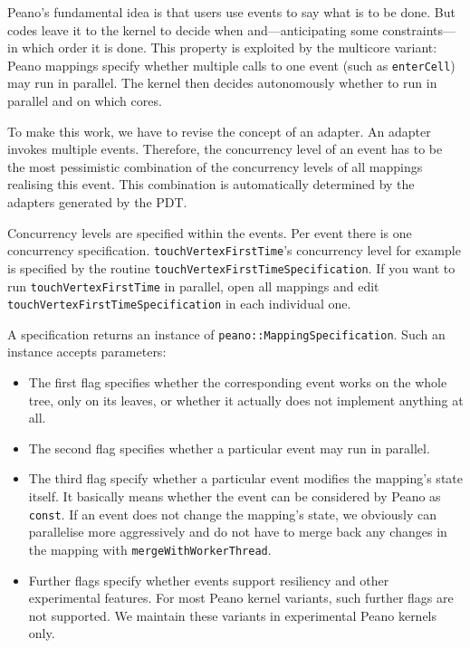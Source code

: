 Peano's fundamental idea is that users use events to say what is to be done. 
But codes leave it to the kernel to decide when and---anticipating some
constraints---in which order it is done.
This property is exploited by the multicore variant: 
Peano mappings specify whether multiple calls to one event (such as
\texttt{enterCell}) may run in parallel.
The kernel then decides autonomously whether to run in parallel and on which
cores.


To make this work, we have to revise the concept of an adapter. 
An adapter invokes multiple events.
Therefore, the concurrency level of an event has to be the most pessimistic
combination of the concurrency levels of all mappings realising this event.
This combination is automatically determined by the adapters generated by the
PDT.


Concurrency levels are specified within the events. 
Per event there is one concurrency specification. 
\texttt{touchVertexFirstTime}'s concurrency level for example is specified by
the routine \linebreak
\texttt{touchVertexFirstTimeSpecification}.
If you want to run \texttt{touchVertexFirstTime} in parallel, open all mappings
and edit \texttt{touchVertexFirstTimeSpecification} in each individual one.


A specification returns an instance of \texttt{peano::MappingSpecification}. 
Such an instance accepts parameters:
\begin{itemize}
  \item The first flag specifies whether the corresponding event works on the
  whole tree, only on its leaves, or whether it actually does not implement
  anything at all.
  \item The second flag specifies whether a particular event may run in
  parallel.
  \item The third flag specify whether a particular event modifies the mapping's
  state itself. It basically means whether the event can be considered by Peano
  as \texttt{const}. If an event does not change the mapping's state, we
  obviously can parallelise more aggressively and do not have to merge back any
  changes in the mapping with \texttt{mergeWithWorkerThread}.
  \item Further flags specify whether events support resiliency and other
  experimental features. For most Peano kernel variants, such further flags are
  not supported. We maintain these variants in experimental Peano kernels only.
\end{itemize}

